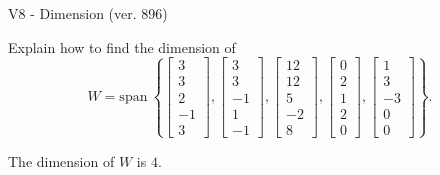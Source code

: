 \begin{exercise}
  \begin{exerciseTitle}V8 - Dimension (ver. 896)\end{exerciseTitle}
  \begin{exerciseStatement}
    Explain how to find the dimension of 
\[W=\mathrm{span}\ \left\{\left[\begin{array}{r}
3 \\
3 \\
2 \\
-1 \\
3
\end{array}\right] , \left[\begin{array}{r}
3 \\
3 \\
-1 \\
1 \\
-1
\end{array}\right] , \left[\begin{array}{r}
12 \\
12 \\
5 \\
-2 \\
8
\end{array}\right] , \left[\begin{array}{r}
0 \\
2 \\
1 \\
2 \\
0
\end{array}\right] , \left[\begin{array}{r}
1 \\
3 \\
-3 \\
0 \\
0
\end{array}\right]\right\}.\]



  \end{exerciseStatement}
  \begin{exerciseAnswer}
   The dimension of \(W\) is  \(4\).
  


  \end{exerciseAnswer}
\end{exercise}